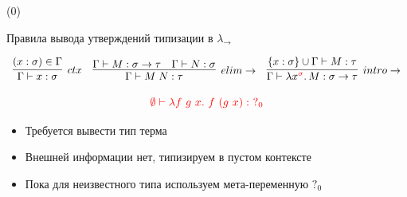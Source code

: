     \begin{frame}[t]{\btypename (0)}
        \begin{block}{Правила вывода утверждений типизации в $\lambda_{\rightarrow}$}
            \vspace{-1em}
            \begin{center}
                \[
                    \begin{array}{l c r}
                        \infer[ctx]{\Gamma \vdash x: \sigma}{(x: \sigma) \in \Gamma}
                        &
                        \infer[elim\to]{\Gamma \vdash M\;N : \tau}{\Gamma \vdash M : \sigma \to \tau & \Gamma \vdash N : \sigma}
                        &
                        \infer[intro\to]{\Gamma \vdash \lambda x^{\color{red} \sigma}\ldotp M : \sigma \to \tau}{\{x : \sigma\} \cup \Gamma \vdash M : \tau}
                    \end{array}
                \]
            \end{center}
        \end{block}
        \[{\color{red}\emptyset \vdash \lambda f~g~x.~f~(g~x) :~ ?_0}\]
        \vspace{-1em}
        \begin{itemize}
            \item Требуется вывести тип терма
            \item Внешней информации нет, типизируем в пустом контексте
            \item Пока для неизвестного типа используем мета-переменную $?_0$
        \end{itemize}
    \end{frame}

